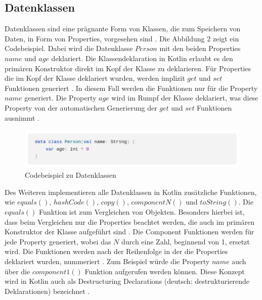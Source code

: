 \documentclass{article}
\begin{document}
\subsection{Datenklassen}
Datenklassen sind eine prägnante Form von Klassen, die zum Speichern von Daten, in Form von Properties, vorgesehen sind \cite{KotlinLangDoc}. Die Abbildung 2 zeigt ein Codebeispiel. Dabei wird die Datenklasse $Person$ mit den beiden Properties $name$ und $age$ deklariert. Die Klassendeklaration in Kotlin erlaubt es den primären Konstruktor direkt im Kopf der Klasse zu deklarieren. Für Properties die im Kopf der Klasse deklariert wurden, werden implizit $get$ und $set$ Funktionen generiert \cite{KotlinLangDoc}. In diesem Fall werden die Funktionen nur für die Property $name$ generiert. Die Property $age$ wird im Rumpf der Klasse deklariert, was diese Property von der automatischen Generierung der $get$ und $set$ Funktionen ausnimmt \cite{KotlinLangDoc}.
\begin{figure}[!htb]
    \centering
    \includegraphics[width=\linewidth]{img/Dataclass.png}
    \caption{Codebeispiel zu Datenklassen\footnotemark}
\end{figure}
\newline
Des Weiteren implementieren alle Datenklassen in Kotlin zusätzliche Funktionen, wie $equals()$, $hashCode()$, $copy()$, $componentN()$ und $toString()$. Die $equals()$ Funktion ist zum Vergleichen von Objekten. Besonders hierbei ist, dass beim Vergleichen nur die Properties beachtet werden, die auch im primären Konstruktor der Klasse aufgeführt sind \cite{KotlinLangDoc}. Die Component Funktionen werden für jede Property generiert, wobei das $N$ durch eine Zahl, beginnend von 1, ersetzt wird. Die Funktionen werden nach der Reihenfolge in der die Properties deklariert wurden, nummeriert \cite{KotlinLangDoc}. Zum Beispiel würde die Property $name$ auch über die $component1()$ Funktion aufgerufen werden können. Diese Konzept wird in Kotlin auch als Destructuring Declarations (deutsch: destrukturierende Deklarationen) bezeichnet \cite{KotlinLangDoc}.
\end{document}
